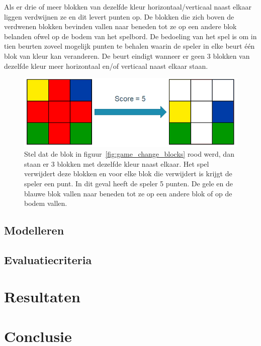 \documentclass[12pt,a4paper,oneside]{book}
\begin{document}
Als er drie of meer blokken van dezelfde kleur horizontaal/verticaal naast elkaar liggen verdwijnen ze en dit levert punten op. De blokken die zich boven de verdwenen blokken bevinden vallen naar beneden tot ze op een andere blok belanden ofwel op de bodem van het spelbord. De bedoeling van het spel is om in tien beurten zoveel mogelijk punten te behalen waarin de speler in elke beurt \'{e}\'{e}n blok van kleur kan veranderen. De beurt eindigt wanneer er geen 3 blokken van dezelfde kleur meer horizontaal en/of verticaal naast elkaar staan.
\begin{figure}
  \centering
    \includegraphics[height=18truemm]{game_score}
  \caption{Stel dat de blok in figuur~\ref{fig:game_change_blocks} rood werd, dan staan er 3 blokken met dezelfde kleur naast elkaar. Het spel verwijdert deze blokken en voor elke blok die verwijdert is krijgt de speler een punt. In dit geval heeft de speler 5 punten. De gele en de blauwe blok vallen naar beneden tot ze op een andere blok of op de bodem vallen.}
  \label{fig:game_score}
\end{figure}
\section{Modelleren}
\section{Evaluatiecriteria}

\chapter{Resultaten}
\chapter{Conclusie}
\end{document}
